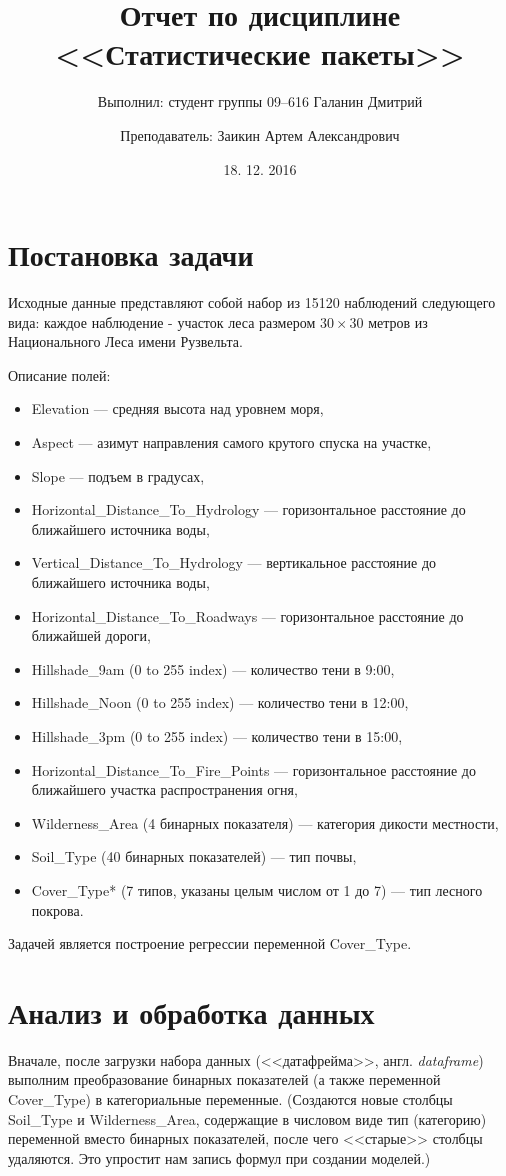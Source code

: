 \documentclass[12pt]{article}
\begin{document}
\title{Отчет по дисциплине <<Статистические пакеты>>}
\author{Выполнил: студент группы 09--616 Галанин Дмитрий \and Преподаватель: Заикин Артем Александрович}
\date{18. 12. 2016}
\maketitle
\section{Постановка задачи}
Исходные данные представляют собой набор из 15120 наблюдений следующего вида: каждое наблюдение - участок леса размером $30 \times 30$ метров из Национального Леса имени Рузвельта.

Описание полей:
\begin{itemize}
	\item Elevation --- средняя высота над уровнем моря,
	\item Aspect --- азимут направления самого крутого спуска на участке,
	\item Slope --- подъем в градусах,
	\item Horizontal\_Distance\_To\_Hydrology --- горизонтальное расстояние до ближайшего источника воды,
	\item Vertical\_Distance\_To\_Hydrology --- вертикальное расстояние до ближайшего источника воды,
	\item Horizontal\_Distance\_To\_Roadways --- горизонтальное расстояние до ближайшей дороги,
	\item Hillshade\_9am (0 to 255 index) --- количество тени в 9:00,
	\item Hillshade\_Noon (0 to 255 index) --- количество тени в 12:00,
	\item Hillshade\_3pm (0 to 255 index) --- количество тени в 15:00,
	\item Horizontal\_Distance\_To\_Fire\_Points --- горизонтальное расстояние до ближайшего участка распространения огня,
	\item Wilderness\_Area (4 бинарных показателя) --- категория дикости местности,
	\item Soil\_Type (40 бинарных показателей) --- тип почвы,
	\item Cover\_Type* (7 типов, указаны целым числом от 1 до 7) --- тип лесного покрова.
\end{itemize}
Задачей является построение регрессии переменной Cover\_Type.
\section{Анализ и обработка данных}
Вначале, после загрузки набора данных (<<датафрейма>>, англ. \textit{dataframe})
выполним преобразование бинарных показателей (а также переменной Cover\_Type) в категориальные переменные.
(Создаются новые столбцы Soil\_Type и Wilderness\_Area, содержащие в числовом виде тип (категорию) переменной вместо
бинарных показателей, после чего <<старые>> столбцы удаляются. Это упростит нам запись формул при создании моделей.)
\end{document}
